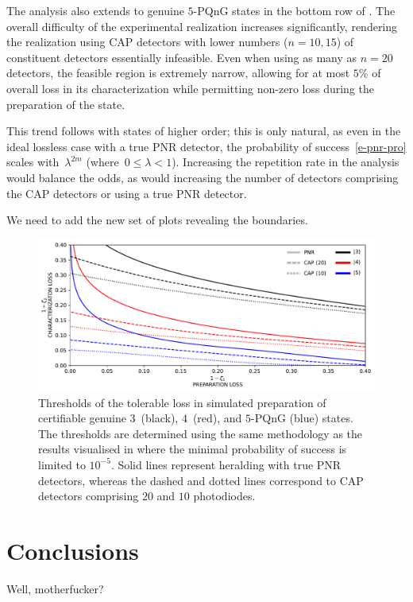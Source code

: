 \documentclass{article}
\begin{document}

The analysis also extends to genuine $5$-PQnG states in the bottom row of . The overall difficulty of the experimental realization increases significantly, rendering the realization using CAP detectors with lower numbers (${n = 10, 15}$) of constituent detectors essentially infeasible. Even when using as many as $n = 20$ detectors, the feasible region is extremely narrow, allowing for at most $5\%$ of overall loss in its characterization while permitting non-zero loss during the preparation of the state.

This trend follows with states of higher order; this is only natural, as even in the ideal lossless case with a true PNR detector, the probability of success~\eqref{e-pnr-pro} scales with~${\lambda^{2m}}$ (where~${0 \leq \lambda < 1}$). Increasing the repetition rate in the analysis would balance the odds, as would increasing the number of detectors comprising the CAP detectors or using a true PNR detector.

We need to add the new set of plots revealing the boundaries.

\begin{figure}[h]
  \begin{center}
    \includegraphics[width = \columnwidth]{import/202504/curves_unified_03_04_05.pdf}
  \end{center}
  \caption{
    Thresholds of the tolerable loss in simulated preparation of certifiable genuine $3$~(black), $4$~(red), and $5$-PQnG (blue) states. The thresholds are determined using the same methodology as the results visualised in  where the minimal probability of success is limited to $10^{-5}$.
    Solid lines represent heralding with true PNR detectors, whereas the dashed and dotted lines correspond to CAP detectors comprising $20$ and $10$ photodiodes.
  }
  \label{f-res-curves}
\end{figure}

%

\FloatBarrier
\section{Conclusions}

Well, motherfucker?

%

\FloatBarrier
\printbibliography[heading = bibnumbered]
\end{document}
